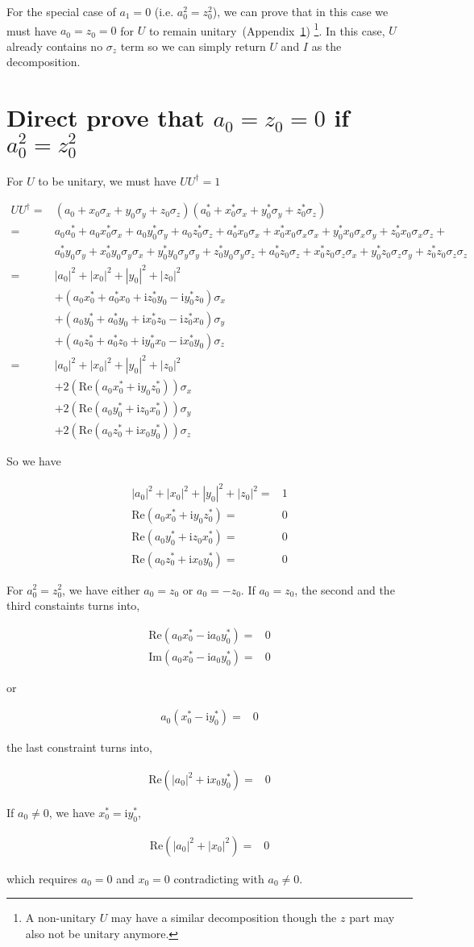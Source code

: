 \documentclass[10pt,fleqn]{article}
\newcommand{\ui}{\mathrm{i}}
\newcommand{\eqar}[1]
{
  \begin{align*}
    #1
  \end{align*}
}
\newcommand{\paren}[1]{{\left({#1}\right)}}
\newcommand{\abs}[1]{{\left|{#1}\right|}}
\begin{document}
For the special case of $a_1=0$ (i.e. $a_0^2=z_0^2$),
we can prove that in this case we must have $a_0=z_0=0$ for $U$ to remain
unitary~(Appendix~\ref{ap:prove-a0z0})
\footnote{A non-unitary $U$ may have a similar decomposition
  though the $z$ part may also not be unitary anymore.}.
In this case, $U$ already contains no $\sigma_z$ term so we can simply
return $U$ and $I$ as the decomposition.

\section{Direct prove that $a_0=z_0=0$ if $a_0^2=z_0^2$}
\label{ap:prove-a0z0}
For $U$ to be unitary, we must have $UU^\dagger=1$
\eqar{
  UU^\dagger=&\paren{a_0 + x_0 \sigma_x + y_0 \sigma_y + z_0 \sigma_z}\paren{a_0^* + x_0^* \sigma_x + y_0^* \sigma_y + z_0^* \sigma_z}\\
  =&a_0a_0^* + a_0x_0^* \sigma_x + a_0y_0^* \sigma_y + a_0z_0^* \sigma_z + a_0^*x_0 \sigma_x + x_0^*x_0 \sigma_x \sigma_x + y_0^*x_0 \sigma_x \sigma_y + z_0^*x_0 \sigma_x \sigma_z +\\
  &a_0^*y_0 \sigma_y + x_0^* y_0 \sigma_y\sigma_x + y_0^* y_0 \sigma_y\sigma_y + z_0^* y_0 \sigma_y\sigma_z + a_0^*z_0 \sigma_z + x_0^* z_0 \sigma_z\sigma_x + y_0^* z_0 \sigma_z\sigma_y + z_0^* z_0 \sigma_z\sigma_z\\
  =&\abs{a_0}^2 + \abs{x_0}^2 + \abs{y_0}^2 + \abs{z_0}^2\\
  &+\paren{a_0 x_0^* + a_0^* x_0 + \ui z_0^* y_0 - \ui y_0^* z_0}\sigma_x\\
  &+\paren{a_0 y_0^* + a_0^* y_0 + \ui x_0^* z_0 - \ui z_0^* x_0}\sigma_y\\
  &+\paren{a_0 z_0^* + a_0^* z_0 + \ui y_0^* x_0 - \ui x_0^* y_0}\sigma_z\\
  =&\abs{a_0}^2 + \abs{x_0}^2 + \abs{y_0}^2 + \abs{z_0}^2\\
  &+2\paren{\mathrm{Re}\paren{a_0 x_0^* + \ui y_0 z_0^*}}\sigma_x\\
  &+2\paren{\mathrm{Re}\paren{a_0 y_0^* + \ui z_0 x_0^*}}\sigma_y\\
  &+2\paren{\mathrm{Re}\paren{a_0 z_0^* + \ui x_0 y_0^*}}\sigma_z
}
So we have
\eqar{
  \abs{a_0}^2 + \abs{x_0}^2 + \abs{y_0}^2 + \abs{z_0}^2=&1\\
  \mathrm{Re}\paren{a_0 x_0^* + \ui y_0 z_0^*}=&0\\
  \mathrm{Re}\paren{a_0 y_0^* + \ui z_0 x_0^*}=&0\\
  \mathrm{Re}\paren{a_0 z_0^* + \ui x_0 y_0^*}=&0
}
For $a_0^2=z_0^2$, we have either $a_0=z_0$ or $a_0=-z_0$.
If $a_0=z_0$, the second and the third constaints turns into,
\eqar{
  \mathrm{Re}\paren{a_0 x_0^* - \ui a_0 y_0^*}=&0\\
  \mathrm{Im}\paren{a_0 x_0^* - \ui a_0 y_0^*}=&0
}
or
\eqar{
  a_0 \paren{x_0^* - \ui y_0^*}=&0
}
the last constraint turns into,
\eqar{
  \mathrm{Re}\paren{\abs{a_0}^2 + \ui x_0 y_0^*}=&0
}
If $a_0\neq0$, we have $x_0^* = \ui y_0^*$,
\eqar{
  \mathrm{Re}\paren{\abs{a_0}^2 + \abs{x_0}^2}=&0
}
which requires $a_0=0$ and $x_0=0$ contradicting with $a_0\neq0$.
\end{document}
